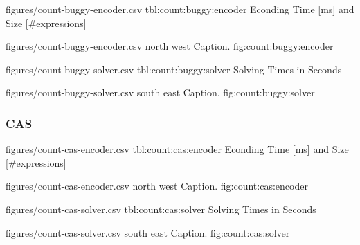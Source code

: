 
\EncoderStatsTable
  {figures/count-buggy-encoder.csv}
  {tbl:count:buggy:encoder}
  {Econding Time [ms] and Size [\#expressions]}

\EncoderStatsGraph
  {figures/count-buggy-encoder.csv}
  {north west}
  {Caption.}
  {fig:count:buggy:encoder}

\newpage
{}

\SolverStatsTable
  {figures/count-buggy-solver.csv}
  {tbl:count:buggy:solver}
  {Solving Times in Seconds}


\SolverStatsGraph
  {figures/count-buggy-solver.csv}
  {south east}
  {Caption.}
  {fig:count:buggy:solver}

\newpage

\subsubsection*{CAS}


\EncoderStatsTable
  {figures/count-cas-encoder.csv}
  {tbl:count:cas:encoder}
  {Econding Time [ms] and Size [\#expressions]}

\EncoderStatsGraph
  {figures/count-cas-encoder.csv}
  {north west}
  {Caption.}
  {fig:count:cas:encoder}

\newpage
{}

\SolverStatsTable
  {figures/count-cas-solver.csv}
  {tbl:count:cas:solver}
  {Solving Times in Seconds}

\SolverStatsGraph
  {figures/count-cas-solver.csv}
  {south east}
  {Caption.}
  {fig:count:cas:solver}
